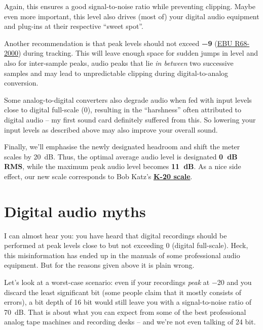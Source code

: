 Again, this ensures a good signal-to-noise ratio while preventing
clipping.  Maybe even more important, this level also drives (most of)
your digital audio equipment and plug-ins at their respective ``sweet
spot''.

Another recommendation is that peak levels should not exceed
\textbf{\SI{-9}{\dBFS}}
(\href{http://tech.ebu.ch/publications/r068}{EBU R68-2000}) during
tracking.  This will leave enough space for sudden jumps in level and
also for inter-sample peaks, audio peaks that lie \emph{in between}
two successive samples and may lead to unpredictable clipping during
digital-to-analog conversion.

Some analog-to-digital converters also degrade audio when fed with
input levels close to digital full-scale (\SI{0}{\dBFS}), resulting in
the ``harshness'' often attributed to digital audio -- my first sound
card definitely suffered from this.  So lowering your input levels as
described above may also improve your overall sound.

Finally, we'll emphasise the newly designated headroom and shift the
meter scales by \SI[addsign=all]{+20}{\dB}.  Thus, the optimal average
audio level is designated \textbf{\SI{0}{\dB} RMS}, while the maximum
peak audio level becomes \textbf{\SI[addsign=all]{+11}{\dB}}.  As a
nice side effect, our new scale corresponds to Bob Katz's
\textbf{\href{http://www.digido.com/level-practices-part-2-includes-the-k-system.html}{K-20
    scale}}.

\section{Digital audio myths}
\label{sec:digital_audio_myths}

I can almost hear you: you have heard that digital recordings should
be performed at peak levels close to but not exceeding \SI{0}{\dBFS}
(digital full-scale).  Heck, this misinformation has ended up in the
manuals of some professional audio equipment.  But for the reasons
given above it is plain wrong.

Let's look at a worst-case scenario: even if your recordings
\emph{peak} at \SI{-20}{\dBFS} and you discard the least significant
bit (some people claim that it mostly consists of errors), a bit depth
of 16 bit would still leave you with a signal-to-noise ratio of
\SI{70}{\dB}.  That is about what you can expect from some of the best
professional analog tape machines and recording desks -- and we're not
even talking of 24 bit.

